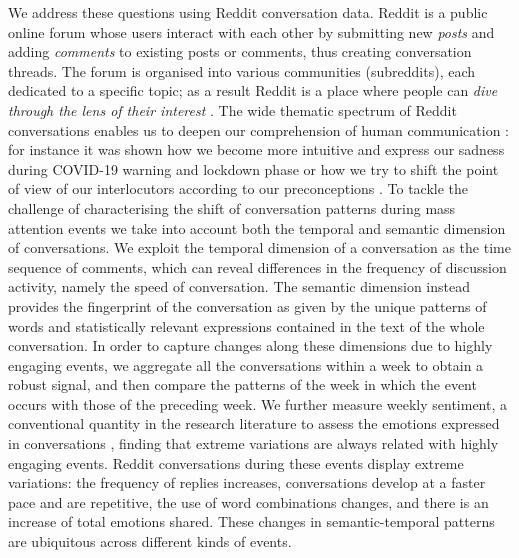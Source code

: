 \documentclass[fleqn,10pt]{wlscirep}
\begin{document}
We address these questions using Reddit conversation data. Reddit is a public online forum whose users interact with each other by submitting new \emph{posts} and adding \emph{comments} to existing posts or comments, thus creating conversation threads. The forum is organised into various communities (subreddits), each dedicated to a specific topic; as a result Reddit is a place where people can \emph{dive through the lens of their interest} \cite{olson2015navigating}. 
The wide thematic spectrum of Reddit conversations enables us to deepen our comprehension of human communication \cite{proferes2021studying}: for instance it was shown how we become more intuitive and express our sadness during COVID-19 warning and lockdown phase \cite{ashokkumar2021social} or how we try to shift the point of view of our interlocutors according to our preconceptions \cite{monti2022language}.
%
To tackle the challenge of characterising the shift of conversation patterns during mass attention events \cite{sasahara2013quantifying,he2017measuring} we take into account both the temporal and semantic dimension of conversations.
%
We exploit the temporal dimension of a conversation as the time sequence of comments, which can reveal differences in the frequency of discussion activity, namely the speed of conversation. The semantic dimension instead provides the fingerprint of the conversation as given by the unique patterns of words and statistically relevant expressions contained in the text of the whole conversation.
In order to capture changes along these dimensions due to highly engaging events, we aggregate all the conversations within a week to obtain a robust signal, and then compare the patterns of the week in which the event occurs with those of the preceding week.
We further measure weekly sentiment, a conventional quantity in the research literature to assess the emotions expressed in conversations \cite{box2021meaningful,bovet2018validation,matalon2021using}, finding that extreme variations are always related with highly engaging events.
Reddit conversations during these events display extreme variations: the frequency of replies increases, conversations develop at a faster pace and are repetitive, the use of word combinations changes, and there is an increase of total emotions shared.
These changes in semantic-temporal patterns are ubiquitous across different kinds of events.
\end{document}

